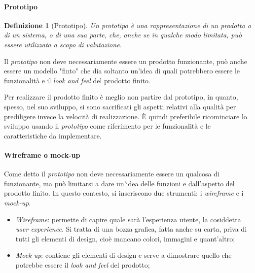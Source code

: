 \documentclass[12pt, a4paper]{report}
\theoremstyle{def}
\newtheorem{definition}{Definizione}
\theoremstyle{definition}
\begin{document}
\paragraph{Prototipo}
\begin{definition}[Prototipo]
    Un \emph{prototipo} è una rappresentazione di un prodotto o di un sistema, o
    di una sua parte, che, anche se in qualche modo limitata, può essere
    utilizzata a scopo di valutazione.
\end{definition}

Il \emph{prototipo} non deve necessariamente essere un prodotto funzionante,
può anche essere un modello "finto" che dia soltanto un'idea di quali potrebbero
essere le funzionalità e il \emph{look and feel} del prodotto finito.

Per realizzare il prodotto finito è meglio non partire dal prototipo, in quanto,
spesso, nel suo sviluppo, si sono sacrificati gli aspetti relativi alla qualità
per prediligere invece la velocità di realizzazione. È quindi preferibile
ricominciare lo sviluppo usando il \emph{prototipo} come riferimento per le
funzionalità e le caratteristiche da implementare.

\paragraph{Wireframe o mock-up}
Come detto il \emph{prototipo} non deve necessariamente essere un qualcosa di
funzionante, ma può limitarsi a dare un'idea delle funzioni e dall'aspetto del
prodotto finito. In questo contesto, si inseriscono due strumenti: i
\emph{wireframe} e i \emph{mock-up}.
\begin{itemize}
    \item \emph{Wireframe}: permette di capire quale sarà l'esperienza utente,
    la cosiddetta \emph{user experience}. Si tratta di una bozza grafica,
    fatta anche su carta, priva di tutti gli elementi di design, cioè mancano
    colori, immagini e quant'altro;
    \item \emph{Mock-up}: contiene gli elementi di design e serve a dimostrare
    quello che potrebbe essere il \emph{look and feel} del prodotto;
\end{itemize}
\end{document}
